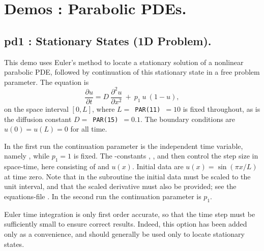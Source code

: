 \documentclass[12pt]{report}
\begin{document}
\chapter{ \AUTO Demos : Parabolic PDEs.} \label{ch:Demos_PDE}

\newpage
\section{ pd1 : Stationary States (1D Problem).} \label{sec:Demos_pd1}
This demo uses Euler's method to locate a stationary solution of
a nonlinear parabolic PDE, followed by continuation of this stationary
state in a free problem parameter. The equation is
 $$ \frac{\partial u }{ \partial t} 
  = D~\frac{\partial^2 u }{ \partial x^2} ~+~  p_1~ u ~( 1-u) , $$
on the space interval $[0,L]$, where $L=$~{\tt PAR(11)}~$=10$ is fixed throughout,
as is the diffusion constant $D=$~{\tt PAR(15)}~$=0.1$.
The boundary conditions are $u(0) = u(L) = 0$ for all time.

In the first run the continuation parameter is the independent time variable,
namely , while $p_1=1$ is fixed.
The \AUTO-constants , , and  then control the step size
in space-time, here consisting of  and  $u(x)$.
Initial data are $u(x)=\sin(\pi x/L)$ at time zero.
Note that in the subroutine  the initial data must be scaled to 
the unit interval, and that the scaled derivative must also be provided; 
see the equations-file .
In the second run the continuation parameter is $p_1$.

Euler time integration is only first order accurate, so that
the time step must be sufficiently small to ensure correct results.
Indeed, this option has been added only as a convenience, and should 
generally be used only to locate stationary states.
\end{document}
